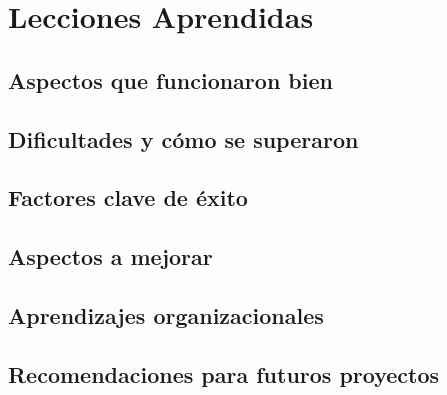 \chapter{Lecciones Aprendidas}

\section{Aspectos que funcionaron bien}
\section{Dificultades y cómo se superaron}
\section{Factores clave de éxito}
\section{Aspectos a mejorar}
\section{Aprendizajes organizacionales}
\section{Recomendaciones para futuros proyectos}
